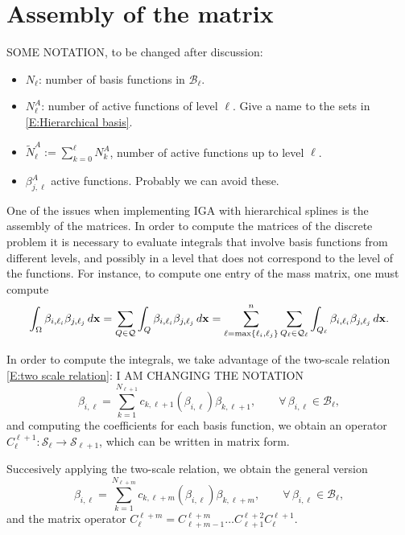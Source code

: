 \documentclass[a4paper]{siamltex1213}
\newcommand{\Rd}{\color{red}}
\renewcommand{\Rd}{\color{black}}
\newcommand\BB{\mathcal B}
\newcommand\QQ{\mathcal Q}
\newcommand\VV{\mathcal S}
\newcommand{\bx}{{\bf x}}
\let\tilde\widetilde
\begin{document}
\section{Assembly of the matrix}
{\Rd SOME NOTATION, to be changed after discussion:
\begin{itemize}
\item $N_\ell$: number of basis functions in $\BB_\ell$.
\item $N^A_\ell$: number of active functions of level $\ell$. Give a name to the sets in \eqref{E:Hierarchical basis}.
\item $\tilde N^A_\ell := \sum_{k=0}^\ell N^A_k$, number of active functions up to level $\ell$.
\item $\beta^A_{j,\ell}$ active functions. Probably we can avoid these.
\end{itemize}
}

One of the issues when implementing IGA with hierarchical splines is the assembly of the matrices. In order to compute the matrices of the discrete problem it is necessary to evaluate integrals that involve basis functions from different levels, and possibly in a level that does not correspond to the level of the functions. For instance, to compute one entry of the mass matrix, one must compute
\begin{equation*}
\int_\Omega \beta_{i,\ell_i} \beta_{j,\ell_j} \, d\bx = \sum_{Q \in \QQ} \int_Q \beta_{i,\ell_i} \beta_{j,\ell_j} \, d\bx = \sum_{\ell = \max\{\ell_i, \ell_j\}}^n \sum_{Q_\ell \in \QQ_\ell} \int_{Q_\ell} \beta_{i,\ell_i} \beta_{j,\ell_j} \, d\bx.
\end{equation*}

In order to compute the integrals, we take advantage of the two-scale relation \eqref{E:two scale relation}: {\Rd I AM CHANGING THE NOTATION}
\begin{equation*}
 \beta_{i,\ell} = \sum_{k=1}^{N_{\ell+1}}
c_{k,\ell+1}(\beta_{i,\ell})\beta_{k,\ell+1}, 
\qquad \forall\,\beta_{i,\ell} \in\BB_\ell,
\end{equation*}
and computing the coefficients for each basis function, we obtain an operator $C_\ell^{\ell+1}: \VV_\ell \longrightarrow \VV_{\ell+1}$, which can be written in matrix form.

Succesively applying the two-scale relation, we obtain the general version
\begin{equation*}
 \beta_{i,\ell} = \sum_{k=1}^{N_{\ell+m}}
c_{k,\ell+m}(\beta_{i,\ell})\beta_{k,\ell+m}, 
\qquad \forall\,\beta_{i,\ell} \in\BB_\ell,
\end{equation*}
and the matrix operator $C_\ell^{\ell+m} = C_{\ell+m-1}^{\ell+m} \ldots C_{\ell+1}^{\ell+2} C_\ell^{\ell+1}$.
\end{document}
